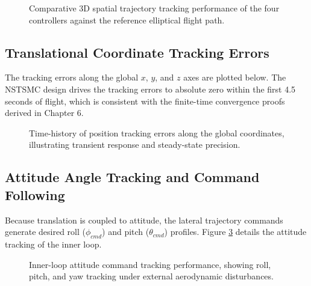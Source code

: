 \begin{figure}[h!]
\centering
{}
\caption{Comparative 3D spatial trajectory tracking performance of the four controllers against the reference elliptical flight path.}
\label{fig:3d_spatial_plot}
\end{figure}

\subsection{Translational Coordinate Tracking Errors}
The tracking errors along the global $x$, $y$, and $z$ axes are plotted below. The NSTSMC design drives the tracking errors to absolute zero within the first 4.5 seconds of flight, which is consistent with the finite-time convergence proofs derived in Chapter 6.

\begin{figure}[h!]
\centering
{}
\caption{Time-history of position tracking errors along the global coordinates, illustrating transient response and steady-state precision.}
\label{fig:translation_errors}
\end{figure}

\subsection{Attitude Angle Tracking and Command Following}
Because translation is coupled to attitude, the lateral trajectory commands generate desired roll ($\phi_{cmd}$) and pitch ($\theta_{cmd}$) profiles. Figure \ref{fig:attitude_tracking} details the attitude tracking of the inner loop.

\begin{figure}[h!]
\centering
{}
\caption{Inner-loop attitude command tracking performance, showing roll, pitch, and yaw tracking under external aerodynamic disturbances.}
\label{fig:attitude_tracking}
\end{figure}

